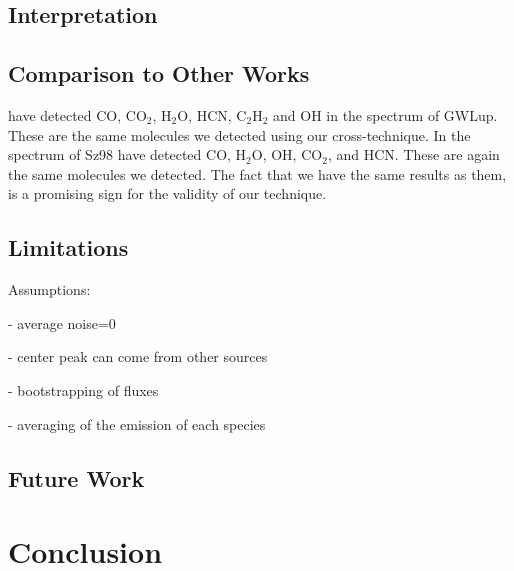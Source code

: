 \documentclass[oneside, single, authoryear, semicolon]{lion-msc}
\newcommand{\4}{$_4$}
\newcommand{\3}{$_3$}
\newcommand{\2}{$_2$}
\begin{document}
\section{Interpretation}
\section{Comparison to Other Works}
\cite{Grant_2023} have detected CO, CO\2, H\2O, HCN, C\2H\2 and OH in the spectrum of GWLup. These are the same molecules we detected using our cross-technique. In the spectrum of Sz98 \cite{Gasman_2023} have detected CO, H\2O, OH, CO\2, and HCN. These are again the same molecules we detected. The fact that we have the same results as them, is a promising sign for the validity of our technique. 
\section{Limitations}
Assumptions:

- average noise=0

- center peak can come from other sources

- bootstrapping of fluxes

- averaging of the emission of each species

\section{Future Work}


\chapter{Conclusion}\label{Ch: Conclusion}



\end{document}
